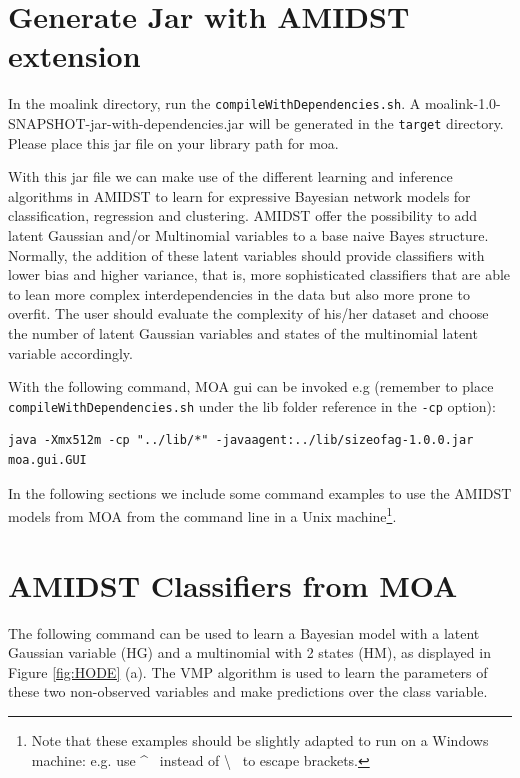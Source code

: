 \section{Generate Jar with AMIDST extension}
In the moalink directory, run the \texttt{compileWithDependencies.sh}. A moalink-1.0-SNAPSHOT-jar-with-dependencies.jar will be generated in the \texttt{target} directory. Please place this jar file on your library path for moa. 

With this jar file we can make use of the different learning and inference algorithms in AMIDST to learn for expressive Bayesian network models for classification, regression and clustering. AMIDST offer the possibility to add latent Gaussian and/or Multinomial variables to a base naive Bayes structure. Normally, the addition of these latent variables should provide classifiers with lower bias and higher variance, that is, more sophisticated classifiers that are able to lean more complex interdependencies in the data but also more prone to overfit. The user should evaluate the complexity of his/her dataset and choose the number of latent Gaussian variables and states of the multinomial latent variable accordingly.

With the following command, MOA gui can be invoked e.g (remember to place \texttt{compileWithDependencies.sh} under the lib folder reference in the \verb'-cp' option):

\begin{verbatim}
java -Xmx512m -cp "../lib/*" -javaagent:../lib/sizeofag-1.0.0.jar
moa.gui.GUI
\end{verbatim}

In the following sections we include some command examples to use the AMIDST models from MOA from the command line in a Unix machine\footnote{Note that these examples should be slightly adapted to run on a Windows machine: e.g. use \textasciicircum~ instead of \textbackslash~ to escape brackets.}.

\section{AMIDST Classifiers from MOA}

The following command can be used to learn a Bayesian model with a latent Gaussian variable (HG) and a multinomial with 2 states (HM), as displayed in Figure \ref{fig:HODE} (a). The VMP algorithm is used to learn the parameters of these two non-observed variables and make predictions over the class variable.

